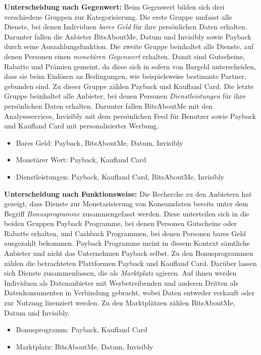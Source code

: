 \noindent \textbf{Unterscheidung nach Gegenwert:} Beim Gegenwert bilden sich drei verschiedene Gruppen zur Kategorisierung. Die erste Gruppe umfasst alle Dienste, bei denen Individuen \textit{bares Geld} für ihre persönlichen Daten erhalten. Darunter fallen die Anbieter \linebreak BitsAboutMe, Datum und Invisibly sowie Payback durch seine Auszahlungsfunktion. Die zweite Gruppe beinhaltet alle Dienste, auf denen Personen einen \textit{monetären Gegenwert} erhalten. Damit sind Gutscheine, Rabatte und Prämien gemeint, da diese sich in sofern von Bargeld unterscheiden, dass sie beim Einlösen an Bedingungen, wie beispielsweise bestimmte Partner, gebunden sind. Zu dieser Gruppe zählen Payback und Kaufland Card. Die letzte Gruppe beinhaltet alle Anbieter, bei denen Personen \textit{Dienstleistungen} für ihre persönlichen Daten erhalten. Darunter fallen BitsAboutMe mit den Analyseservices, \linebreak Invisibly mit dem persönlichen Feed für Benutzer sowie Payback und Kaufland Card mit personalisierter Werbung.
\begin{itemize}
    \item Bares Geld: Payback, BitsAboutMe, Datum, Invisibly
    \item Monetärer Wert: Payback, Kaufland Card
    \item Dienstleistungen: Payback, Kaufland Card, BitsAboutMe, Invisibly
\end{itemize}

\noindent \textbf{Unterscheidung nach Funktionsweise:} Die Recherche zu den Anbietern hat gezeigt, dass Dienste zur Monetarisierung von Konsumdaten bereits unter dem Begriff \textit{Bonusprogramme} zusammengefasst werden. Diese unterteilen sich in die beiden Gruppen \linebreak Payback Programme, bei denen Personen Gutscheine oder Rabatte erhalten, und \linebreak Cashback Programmen, bei denen Personen bares Geld ausgezahlt bekommen. \linebreak Payback Programme meint in diesem Kontext sämtliche Anbieter und nicht das Unternehmen Payback selbst. Zu den Bonusprogrammen zählen die betrachteten Plattformen \linebreak Payback und Kaufland Card. Darüber lassen sich Dienste zusammenfassen, die als \textit{Marktplatz} agieren. Auf ihnen werden Individuen als Datenanbieter mit Werbetreibenden und anderen Dritten als Datenkonsumenten in Verbindung gebracht, wobei Daten entweder verkauft oder zur Nutzung lizenziert werden. Zu den Marktplätzen zählen \linebreak BitsAboutMe, Datum und Invisibly.
\begin{itemize}
    \item Bonusprogramm: Payback, Kaufland Card
    \item Marktplatz: BitsAboutMe, Datum, Invisibly
\end{itemize}

